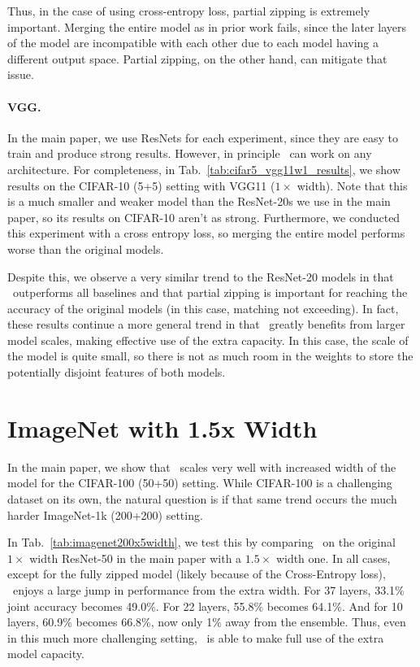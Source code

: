 Thus, in the case of using cross-entropy loss, partial zipping is extremely important. Merging the entire model as in prior work fails, since the later layers of the model are incompatible with each other due to each model having a different output space. Partial zipping, on the other hand, can mitigate that issue.



\paragraph{VGG.}\label{ap:vgg}
In the main paper, we use ResNets for each experiment, since they are easy to train and produce strong results. However, in principle \name{}\ can work on any architecture. For completeness, in Tab.~\ref{tab:cifar5_vgg11w1_results}, we show results on the CIFAR-10 (5+5) setting with VGG11 ($1\times$ width). Note that this is a much smaller and weaker model than the ResNet-20s we use in the main paper, so its results on CIFAR-10 aren't as strong. Furthermore, we conducted this experiment with a cross entropy loss, so merging the entire model performs worse than the original models.

Despite this, we observe a very similar trend to the ResNet-20 models in that \name{}\ outperforms all baselines and that partial zipping is important for reaching the accuracy of the original models (in this case, matching not exceeding). In fact, these results continue a more general trend in that \name{}\ greatly benefits from larger model scales, making effective use of the extra capacity. In this case, the scale of the model is quite small, so there is not as much room in the weights to store the potentially disjoint features of both models.



\section{ImageNet with 1.5x Width}
In the main paper, we show that \name{}\ scales very well with increased width of the model for the CIFAR-100 (50+50) setting. While CIFAR-100 is a challenging dataset on its own, the natural question is if that same trend occurs the much harder ImageNet-1k (200+200) setting.

In Tab.~\ref{tab:imagenet200x5width}, we test this by comparing \name{}\ on the original $1\times$ width ResNet-50 in the main paper with a $1.5\times$ width one.
In all cases, except for the fully zipped model (likely because of the Cross-Entropy loss), \name{}\ enjoys a large jump in performance from the extra width. For 37 layers, 33.1\% joint accuracy becomes 49.0\%. For 22 layers, 55.8\% becomes 64.1\%. And for 10 layers, 60.9\% becomes 66.8\%, now only 1\% away from the ensemble. Thus, even in this much more challenging setting, \name{}\ is able to make full use of the extra model capacity.

